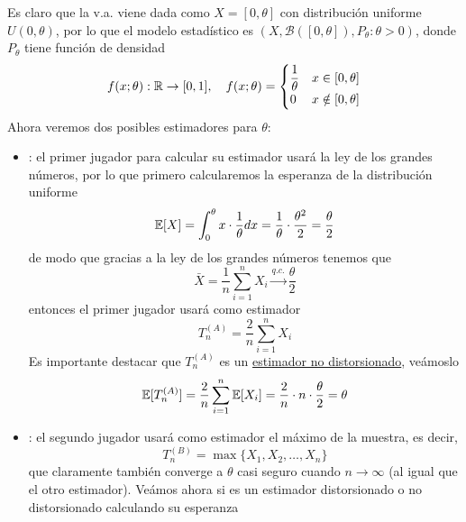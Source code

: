 \begin{ejemplo}[Libro 7.3]
    \noindent
    Es claro que la v.a. viene dada como $X=[0,\theta]$ con distribución uniforme $U(0,\theta)$, por lo que el modelo estadístico es $(X, \mathcal{B}([0,\theta]), P_{\theta}:\theta > 0)$, donde $P_{\theta}$ tiene función de densidad
    \begin{equation*}
        f(x;\theta) : \mathbb{R} \to [0,1] , \quad f(x;\theta) = \begin{cases}
            \dfrac{1}{\theta} & x \in [0,\theta] \\
            0 & x \notin [0,\theta]
        \end{cases}
    \end{equation*}
    Ahora veremos dos posibles estimadores para $\theta$:
    \begin{itemize}
        \item {}: el primer jugador para calcular su estimador usará la ley de los grandes números, por lo que primero calcularemos la esperanza de la distribución uniforme
        \begin{equation*}
            \mathbb{E}[X] = \int_{0}^{\theta} x \cdot \dfrac{1}{\theta} dx = \dfrac{1}{\theta} \cdot \dfrac{\theta^2}{2} = \dfrac{\theta}{2}
        \end{equation*}
        de modo que gracias a la ley de los grandes números tenemos que
        \begin{equation*}
            \bar{X} = \dfrac{1}{n} \sum\limits_{i=1}^{n} X_i \xrightarrow{q.c.} \dfrac{\theta}{2}
        \end{equation*}
        entonces el primer jugador usará como estimador
        \begin{equation*}
            T_{n}^{(A)} = \dfrac{2}{n} \sum\limits_{i=1}^{n} X_i
        \end{equation*}
        Es importante destacar que $T_n^{(A)}$ es un \underline{estimador no distorsionado}, veámoslo
        \begin{equation*}
            \mathbb{E}[T_n^{(A)}]= \dfrac{2}{n} \sum\limits_{i=1}^{n} \mathbb{E}[X_i] = \dfrac{2}{n} \cdot n \cdot \dfrac{\theta}{2} = \theta
        \end{equation*}
        \item {}: el segundo jugador usará como estimador el máximo de la muestra, es decir,
        \begin{equation*}
            T_n^{(B)} = \max\{X_1, X_2, \ldots, X_n\}
        \end{equation*}
        que claramente también converge a $\theta$ casi seguro cuando $n\to \infty$ (al igual que el otro estimador). Veámos ahora si es un estimador distorsionado o no distorsionado calculando su esperanza

\end{itemize}
\end{ejemplo}

